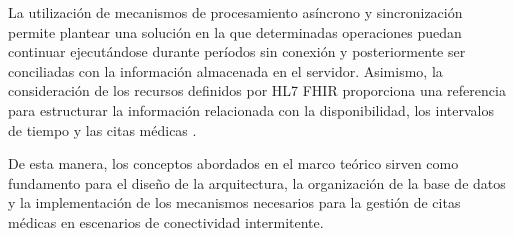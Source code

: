 La utilización de mecanismos de procesamiento asíncrono y sincronización permite plantear una solución en la que determinadas operaciones puedan continuar ejecutándose durante períodos sin conexión y posteriormente ser conciliadas con la información almacenada en el servidor. Asimismo, la consideración de los recursos definidos por HL7 FHIR proporciona una referencia para estructurar la información relacionada con la disponibilidad, los intervalos de tiempo y las citas médicas \parencite{zhao2017,santenet2026}.

De esta manera, los conceptos abordados en el marco teórico sirven como fundamento para el diseño de la arquitectura, la organización de la base de datos y la implementación de los mecanismos necesarios para la gestión de citas médicas en escenarios de conectividad intermitente.
